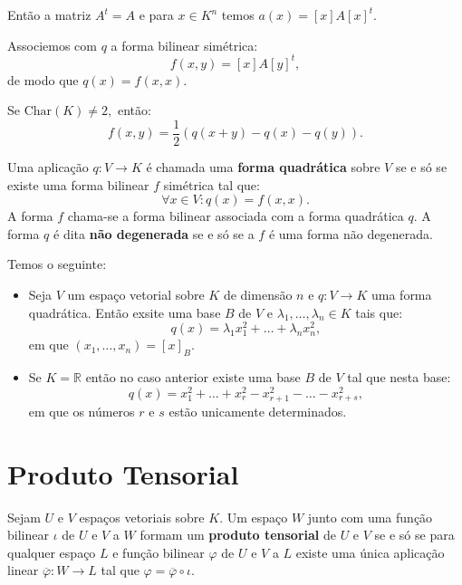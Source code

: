 \documentclass[11pt,twoside,a4paper]{book}
\begin{document}
\noindent
Então a matriz $A^t=A$ e para $x\in K^n$ temos $a(x)=[x]A[x]^t.$

\medskip
\noindent
Associemos com $q$ a forma bilinear simétrica:
\[
f(x,y)=[x]A[y]^t,
\]
de modo que $q(x)=f(x,x).$

\medskip
\noindent
Se $\mathrm{Char}(K)\neq 2,$ então:
\[
f(x,y)=\frac{1}{2}\left(q(x+y)-q(x)-q(y)\right).
\]

\begin{definicao}
Uma aplicação $q:V\rightarrow K$ é chamada uma \textbf{forma quadrática} sobre $V$ se e só se existe uma forma bilinear $f$ simétrica tal que:
\[
\forall x\in V:q(x)=f(x,x).
\]
A forma $f$ chama-se a forma bilinear associada com a forma quadrática $q.$ A forma $q$ é dita \textbf{não degenerada} se e só se a $f$ é uma forma não degenerada.
\end{definicao}

\begin{teorema}
Temos o seguinte:
\begin{itemize}
\item Seja $V$ um espaço vetorial sobre $K$ de dimensão $n$ e $q:V\rightarrow K$ uma forma quadrática. Então exsite uma base $B$ de $V$ e $\lambda_1,\dots,\lambda_n\in K$ tais que:
\[
q(x)=\lambda_1x_1^2+\dots+\lambda_nx_n^2,
\]
em que $(x_1,\dots,x_n)=[x]_B.$
\item Se $K=\mathbb{R}$ então no caso anterior existe uma base $B$ de $V$ tal que nesta base:
\[
q(x)=x_1^2+\dots+x_r^2-x_{r+1}^2-\dots-x_{r+s}^2,
\]
em que os números $r$ e $s$ estão unicamente determinados.
\end{itemize}
\end{teorema}

\section{Produto Tensorial}

\begin{definicao}
Sejam $U$ e $V$ espaços vetoriais sobre $K.$ Um espaço $W$ junto com uma função bilinear $\iota$ de $U$ e $V$ a $W$ formam um \textbf{produto tensorial} de $U$ e $V$ se e só se para qualquer espaço $L$ e função bilinear $\varphi$ de $U$ e $V$ a $L$ existe uma única aplicação linear $\overline{\varphi}:W\rightarrow L$ tal que $\varphi=\overline{\varphi}\circ\iota.$
\end{definicao}
\end{document}
